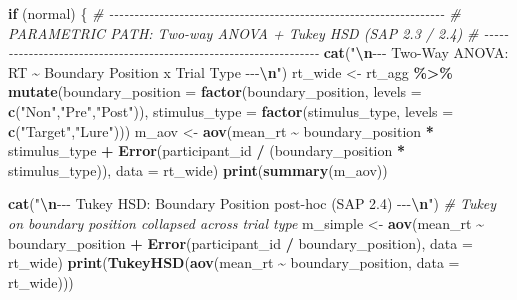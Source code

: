 \documentclass[
]{article}
\newenvironment{Shaded}{\begin{snugshade}}{\end{snugshade}}
\newcommand{\AttributeTok}[1]{\textcolor[rgb]{0.13,0.29,0.53}{#1}}
\newcommand{\CommentTok}[1]{\textcolor[rgb]{0.56,0.35,0.01}{\textit{#1}}}
\newcommand{\ControlFlowTok}[1]{\textcolor[rgb]{0.13,0.29,0.53}{\textbf{#1}}}
\newcommand{\FunctionTok}[1]{\textcolor[rgb]{0.13,0.29,0.53}{\textbf{#1}}}
\newcommand{\NormalTok}[1]{#1}
\newcommand{\OtherTok}[1]{\textcolor[rgb]{0.56,0.35,0.01}{#1}}
\newcommand{\SpecialCharTok}[1]{\textcolor[rgb]{0.81,0.36,0.00}{\textbf{#1}}}
\newcommand{\StringTok}[1]{\textcolor[rgb]{0.31,0.60,0.02}{#1}}
\begin{document}
\begin{Shaded}
\begin{Highlighting}[]
  \ControlFlowTok{if}\NormalTok{ (normal) \{}
    \CommentTok{\# {-}{-}{-}{-}{-}{-}{-}{-}{-}{-}{-}{-}{-}{-}{-}{-}{-}{-}{-}{-}{-}{-}{-}{-}{-}{-}{-}{-}{-}{-}{-}{-}{-}{-}{-}{-}{-}{-}{-}{-}{-}{-}{-}{-}{-}{-}{-}{-}{-}{-}{-}{-}{-}{-}{-}{-}{-}{-}{-}{-}{-}{-}{-}{-}{-}{-}{-}}
    \CommentTok{\# PARAMETRIC PATH: Two{-}way ANOVA + Tukey HSD  (SAP 2.3 / 2.4)}
    \CommentTok{\# {-}{-}{-}{-}{-}{-}{-}{-}{-}{-}{-}{-}{-}{-}{-}{-}{-}{-}{-}{-}{-}{-}{-}{-}{-}{-}{-}{-}{-}{-}{-}{-}{-}{-}{-}{-}{-}{-}{-}{-}{-}{-}{-}{-}{-}{-}{-}{-}{-}{-}{-}{-}{-}{-}{-}{-}{-}{-}{-}{-}{-}{-}{-}{-}{-}{-}{-}}
    \FunctionTok{cat}\NormalTok{(}\StringTok{"}\SpecialCharTok{\textbackslash{}n}\StringTok{{-}{-}{-} Two{-}Way ANOVA: RT \textasciitilde{} Boundary Position x Trial Type {-}{-}{-}}\SpecialCharTok{\textbackslash{}n}\StringTok{"}\NormalTok{)}
\NormalTok{    rt\_wide }\OtherTok{\textless{}{-}}\NormalTok{ rt\_agg }\SpecialCharTok{\%\textgreater{}\%}
      \FunctionTok{mutate}\NormalTok{(}\AttributeTok{boundary\_position =} \FunctionTok{factor}\NormalTok{(boundary\_position, }\AttributeTok{levels =} \FunctionTok{c}\NormalTok{(}\StringTok{"Non"}\NormalTok{,}\StringTok{"Pre"}\NormalTok{,}\StringTok{"Post"}\NormalTok{)),}
             \AttributeTok{stimulus\_type     =} \FunctionTok{factor}\NormalTok{(stimulus\_type,     }\AttributeTok{levels =} \FunctionTok{c}\NormalTok{(}\StringTok{"Target"}\NormalTok{,}\StringTok{"Lure"}\NormalTok{)))}
\NormalTok{    m\_aov }\OtherTok{\textless{}{-}} \FunctionTok{aov}\NormalTok{(mean\_rt }\SpecialCharTok{\textasciitilde{}}\NormalTok{ boundary\_position }\SpecialCharTok{*}\NormalTok{ stimulus\_type }\SpecialCharTok{+}
                   \FunctionTok{Error}\NormalTok{(participant\_id }\SpecialCharTok{/}\NormalTok{ (boundary\_position }\SpecialCharTok{*}\NormalTok{ stimulus\_type)),}
                 \AttributeTok{data =}\NormalTok{ rt\_wide)}
    \FunctionTok{print}\NormalTok{(}\FunctionTok{summary}\NormalTok{(m\_aov))}

    \FunctionTok{cat}\NormalTok{(}\StringTok{"}\SpecialCharTok{\textbackslash{}n}\StringTok{{-}{-}{-} Tukey HSD: Boundary Position post{-}hoc (SAP 2.4) {-}{-}{-}}\SpecialCharTok{\textbackslash{}n}\StringTok{"}\NormalTok{)}
    \CommentTok{\# Tukey on boundary position collapsed across trial type}
\NormalTok{    m\_simple }\OtherTok{\textless{}{-}} \FunctionTok{aov}\NormalTok{(mean\_rt }\SpecialCharTok{\textasciitilde{}}\NormalTok{ boundary\_position }\SpecialCharTok{+} \FunctionTok{Error}\NormalTok{(participant\_id }\SpecialCharTok{/}\NormalTok{ boundary\_position),}
                    \AttributeTok{data =}\NormalTok{ rt\_wide)}
    \FunctionTok{print}\NormalTok{(}\FunctionTok{TukeyHSD}\NormalTok{(}\FunctionTok{aov}\NormalTok{(mean\_rt }\SpecialCharTok{\textasciitilde{}}\NormalTok{ boundary\_position, }\AttributeTok{data =}\NormalTok{ rt\_wide)))}


\end{Highlighting}
\end{Shaded}
\end{document}
